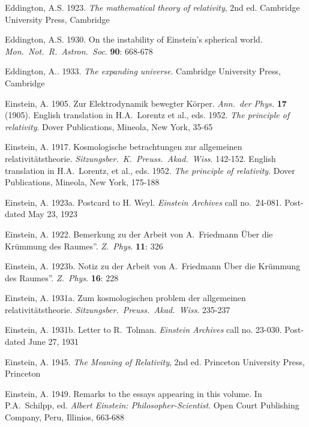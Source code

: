 \documentclass[12 pt]{article}
\begin{document}
\begin{thebibliography}{}
 Eddington, A.S. 1923. \textit{The mathematical theory of relativity}, 2nd ed. Cambridge University Press, Cambridge

 Eddington, A.S. 1930. On the instability of Einstein’s spherical world. \textit{Mon.\ Not.\ R.\ Astron.\ Soc}. \textbf{90}: 668-678

 Eddington, A.. 1933. \textit{The expanding universe}. Cambridge University Press, Cambridge

 Einstein, A. 1905. Zur Elektrodynamik bewegter K\"{o}rper. \textit{Ann.\ der Phys.} \textbf{17} (1905). English translation in H.A.\ Lorentz et al., eds. 1952. \textit{The principle of relativity}. Dover Publications, Mineola, New York, 35-65

 Einstein, A. 1917. Kosmologische betrachtungen zur allgemeinen relativit\"{a}tstheorie. \textit{Sitzungsber.\ K.\ Preuss.\ Akad.\ Wiss}. 142-152. English translation in H.A.\ Lorentz, et al., eds. 1952. \textit{The principle of relativity}. Dover Publications, Mineola, New York, 175-188

 Einstein, A. 1923a. Postcard to H. Weyl. \textit{Einstein Archives} call no.\ 24-081. Post-dated May 23, 1923

 Einstein, A. 1922. Bemerkung zu der Arbeit von A.\ Friedmann {\glqq}{{\"U}ber} die Kr\"{u}mmung des Raumes''. \textit{Z.\ Phys}. \textbf{11}: 326

 Einstein, A. 1923b. Notiz zu der Arbeit von A.\ Friedmann {\glqq}{{\"U}ber} die Kr\"{u}mmung des Raumes''. \textit{Z.\ Phys}. \textbf{16}: 228

 Einstein, A. 1931a. Zum kosmologischen problem der allgemeinen relativit\"{a}tstheorie. \textit{Sitzungsber.\ Preuss.\ Akad.\ Wiss}. 235-237

 Einstein, A. 1931b. Letter to R.\ Tolman. \textit{Einstein Archives} call no. 23-030. Post-dated June 27, 1931

 Einstein, A. 1945. \textit{The Meaning of Relativity}, 2nd ed. Princeton University Press, Princeton

 Einstein, A. 1949. Remarks to the essays appearing in this volume. In P.A.\ Schilpp, ed. \textit{Albert Einstein: Philosopher-Scientist}. Open Court Publishing Company, Peru, Illinios, 663-688


\end{thebibliography}
\end{document}
